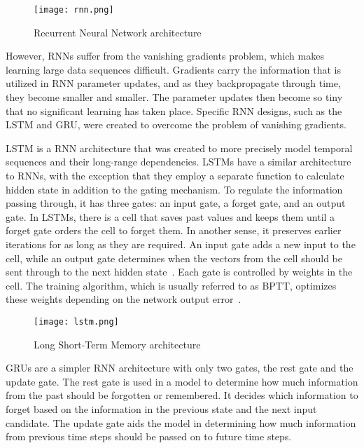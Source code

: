 \begin{figure}[htbp]
    \centering
    \texttt{[image: rnn.png]}
    \caption{Recurrent Neural Network architecture~\cite{Gupta2017RecurrentLearning}}
    \label{fig:rnn}
\end{figure}

However, RNNs suffer from the vanishing gradients problem, which makes learning large data sequences difficult. Gradients carry the information that is utilized in \gls{RNN} parameter updates, and as they backpropagate through time, they become smaller and smaller. The parameter updates then become so tiny that no significant learning has taken place. Specific \gls{RNN} designs, such as the \gls{LSTM} and \gls{GRU}, were created to overcome the problem of vanishing gradients.

\gls{LSTM} is a \gls{RNN} architecture that was created to more precisely model temporal sequences and their long-range dependencies. \gls{LSTM}s have a similar architecture to RNNs, with the exception that they employ a separate function to calculate hidden state in addition to the gating mechanism. To regulate the information passing through, it has three gates: an input gate, a forget gate, and an output gate. In \gls{LSTM}s, there is a cell that saves past values and keeps them until a forget gate orders the cell to forget them. In another sense, it preserves earlier iterations for as long as they are required. An input gate adds a new input to the cell, while an output gate determines when the vectors from the cell should be sent through to the next hidden state~\cite{Khan2019RNN-LSTM-GRUTransformation}. Each gate is controlled by weights in the cell. The training algorithm, which is usually referred to as \gls{BPTT}, optimizes these weights depending on the network output error~\cite{Madhavan2021DeepDeveloper}.

\begin{figure}[htbp]
    \centering
    \texttt{[image: lstm.png]}
    \caption{Long Short-Term Memory architecture~\cite{Madhavan2021DeepDeveloper}}
    \label{fig:lstm}
\end{figure}

\gls{GRU}s are a simpler \gls{RNN} architecture with only two gates, the rest gate and the update gate. The rest gate is used in a model to determine how much information from the past should be forgotten or remembered. It decides which information to forget based on the information in the previous state and the next input candidate. The update gate aids the model in determining how much information from previous time steps should be passed on to future time steps.

